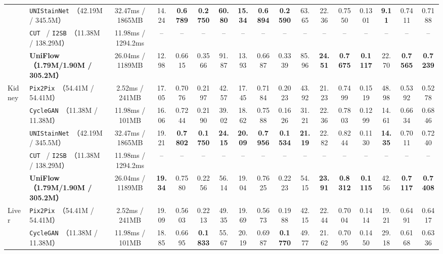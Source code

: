 \documentclass[journal]{IEEEtran}
\newcommand{\methodname}{UniFlow}
\begin{document}
\begin{table}[!t]
{\begin{tabular}{llc|cccc|cccc|cccccc}
& \texttt{UNIStainNet}~\cite{ref_unistainnet}（42.19M / 345.5M） & 32.47ms / 1865MB & 14.24 & \textbf{0.6789} & \textbf{0.2750} & \textbf{60.80} & \textbf{15.34} & \textbf{0.6894} & \textbf{0.2590} & 63.65 & 22.36 & 0.7550 & 0.1301 & \textbf{9.11} & 0.7411 & 0.7188 \\
& \texttt{CUT}~\cite{ref_cut} / \texttt{I2SB}~\cite{ref_i2sb}（11.38M / 138.29M） & 11.98ms / 1294.2ms & -- & -- & -- & -- & -- & -- & -- & -- & -- & -- & -- & -- & -- & -- \\
& \textbf{\methodname{}（1.79M/1.90M / 305.2M）} & 26.04ms / 1189MB & 12.98 & 0.6615 & 0.3566 & 91.87 & 13.93 & 0.6687 & 0.3339 & 85.96 & \textbf{24.51} & \textbf{0.7675} & \textbf{0.1117} & 22.70 & \textbf{0.7565} & \textbf{0.7239} \\
\midrule
\multirow{5}{*}{Kidney}
& \texttt{Pix2Pix}~\cite{ref_pix2pix}（54.41M / 54.41M） & 2.52ms / 241MB & 17.05 & 0.7076 & 0.2197 & 42.57 & 17.45 & 0.7184 & 0.2023 & 43.92 & 21.23 & 0.7499 & 0.1519 & 48.98 & 0.5392 & 0.5278 \\
& \texttt{CycleGAN}~\cite{ref_cyclegan}（11.38M / 11.38M） & 11.98ms / 101MB & 16.06 & 0.7244 & 0.2190 & 39.02 & 18.62 & 0.7588 & 0.1626 & 31.21 & 22.36 & 0.7803 & 0.1299 & 14.61 & 0.6634 & 0.6846 \\
& \texttt{UNIStainNet}~\cite{ref_unistainnet}（42.19M / 345.5M） & 32.47ms / 1865MB & 19.21 & \textbf{0.7802} & \textbf{0.1750} & \textbf{24.15} & \textbf{20.09} & \textbf{0.7956} & \textbf{0.1534} & \textbf{21.19} & 22.82 & 0.8244 & 0.1130 & \textbf{14.35} & 0.7011 & 0.7240 \\
& \texttt{CUT}~\cite{ref_cut} / \texttt{I2SB}~\cite{ref_i2sb}（11.38M / 138.29M） & 11.98ms / 1294.2ms & -- & -- & -- & -- & -- & -- & -- & -- & -- & -- & -- & -- & -- & -- \\
& \textbf{\methodname{}（1.79M/1.90M / 305.2M）} & 26.04ms / 1189MB & \textbf{19.34} & 0.7580 & 0.2256 & 56.14 & 19.04 & 0.7625 & 0.2223 & 54.15 & \textbf{23.91} & \textbf{0.8312} & \textbf{0.1115} & 42.56 & \textbf{0.7117} & \textbf{0.7408} \\
\midrule
\multirow{5}{*}{Liver}
& \texttt{Pix2Pix}~\cite{ref_pix2pix}（54.41M / 54.41M） & 2.52ms / 241MB & 19.09 & 0.5603 & 0.2213 & 49.35 & 19.69 & 0.5673 & 0.1988 & 42.15 & 22.44 & 0.7004 & 0.1414 & 19.21 & 0.6491 & 0.6417 \\
& \texttt{CycleGAN}~\cite{ref_cyclegan}（11.38M / 11.38M） & 11.98ms / 101MB & 18.85 & 0.6695 & \textbf{0.1833} & 55.67 & 20.19 & 0.6987 & \textbf{0.1770} & 49.77 & 21.62 & 0.7095 & 0.1450 & 29.18 & 0.6168 & 0.6336 \\

\end{tabular}}
\end{table}
\end{document}
